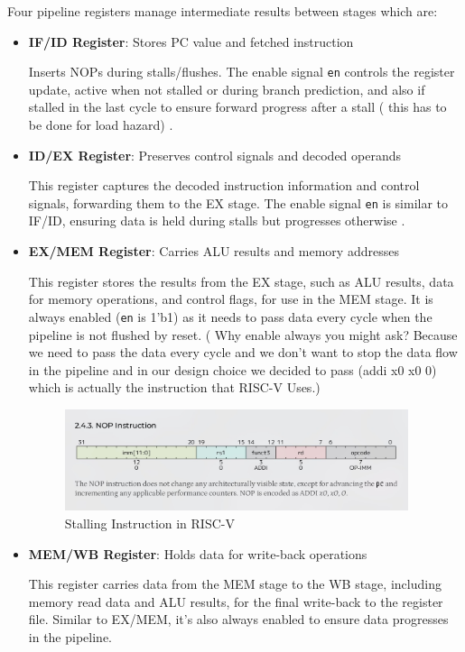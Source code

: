 \documentclass{article}
\numberwithin{figure}{section}
\numberwithin{table}{section}
\begin{document}
Four pipeline registers manage intermediate results between stages which are:
\begin{itemize}
    \item \textbf{IF/ID Register}: Stores PC value and fetched instruction

    Inserts NOPs during stalls/flushes. The enable signal \texttt{en} controls the register update, active when not stalled or during branch prediction, and also if stalled in the last cycle to ensure forward progress after a stall ( this has to be done for load hazard) .
    \item \textbf{ID/EX Register}: Preserves control signals and decoded operands

    This register captures the decoded instruction information and control signals, forwarding them to the EX stage. The enable signal \texttt{en} is similar to IF/ID, ensuring data is held during stalls but progresses otherwise .
    \item \textbf{EX/MEM Register}: Carries ALU results and memory addresses

    This register stores the results from the EX stage, such as ALU results, data for memory operations, and control flags, for use in the MEM stage. It is always enabled (\texttt{en} is 1'b1) as it needs to pass data every cycle when the pipeline is not flushed by reset. ( Why enable always you might ask? Because we need to pass the data every cycle and we don't want to stop the data flow in the pipeline and in our design choice we decided to pass (addi x0 x0 0) which is actually the instruction that RISC-V Uses.)

    \begin{figure}[H]
        \centering
        \includegraphics[width=0.95\textwidth]{addix0.jpg}
        \caption{Stalling Instruction in RISC-V}
        \label{fig:addix0}
    \end{figure}
    
    \item \textbf{MEM/WB Register}: Holds data for write-back operations
   
    This register carries data from the MEM stage to the WB stage, including memory read data and ALU results, for the final write-back to the register file. Similar to EX/MEM, it's also always enabled to ensure data progresses in the pipeline. 

\end{itemize}
\end{document}
